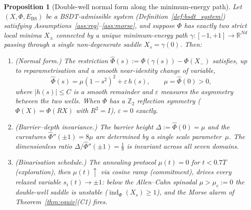 \documentclass[11pt,a4paper]{article}
\newcommand{\R}{\mathbb{R}}
\newcommand{\Ebs}{E_{\mathrm{BS}}}
\DeclareMathOperator{\ind}{ind}
\newtheorem{proposition}[theorem]{Proposition}
\begin{document}
\begin{proposition}[Double-well normal form along the
  minimum-energy path]\label{prop:doublewell}
Let $(X,\Phi,\Ebs)$ be a BSDT-admissible system
(Definition~\ref{def:bsdt_system}) satisfying
Assumptions~\ref{ass:reg}--\ref{ass:morse}, and suppose
$\Phi$ has exactly two strict local minima $X_{\pm}$
connected by a unique minimum-energy path
$\gamma:[{-}1,{+}1]\to\R^{Nd}$ passing through a single
non-degenerate saddle $X_s = \gamma(0)$.  Then:

\begin{enumerate}[nosep]
  \item\textup{(Normal form.)}
    The restriction $\hat\Phi(s):=\Phi(\gamma(s))-\Phi(X_-)$
    satisfies, up to reparametrisation and a smooth
    near-identity change of variable,
    \begin{equation}\label{eq:dw_normalform}
      \hat\Phi(s) = \mu(1-s^2)^2 + \varepsilon\,h(s),
      \qquad \mu=\hat\Phi(0)>0,
    \end{equation}
    where $|h(s)|\le C$ is a smooth remainder and
    $\varepsilon$ measures the asymmetry between the two
    wells.  When $\Phi$ has a $\mathbb{Z}_2$ reflection symmetry
    ($\Phi(X)=\Phi(RX)$ with $R^2=I$), $\varepsilon=0$
    exactly.

  \item\textup{(Barrier--depth invariance.)}
    The barrier height $\Delta:=\hat\Phi(0)=\mu$ and the
    curvatures $\hat\Phi''(\pm 1)=8\mu$ are determined by
    a single scale parameter~$\mu$.  The dimensionless
    ratio $\Delta/\hat\Phi''(\pm 1)=\tfrac{1}{8}$ is
    invariant across all seven domains.

  \item\textup{(Binarisation schedule.)}
    The annealing protocol $\mu(t)=0$ for $t<0.7T$
    (exploration), then $\mu(t)\uparrow$ via cosine ramp
    (commitment), drives every relaxed variable
    $s_i(t)\to\pm 1$: below the Allen--Cahn spinodal
    $\mu>\mu_c:=0$ the double-well saddle is unstable
    ($\ind_\Phi(X_s)\ge 1$), and the Morse alarm of
    Theorem~\ref{thm:equiv}(C1) fires.
\end{enumerate}
\end{proposition}
\end{document}
